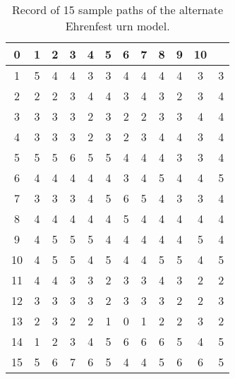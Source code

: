 \documentclass[12pt]{article}
\begin{document}
\begin{example}
    \begin{table}
      \centering
      \begin{tabular}{c|ccccccccccc}
        0 & 1 & 2 & 3 & 4 & 5 & 6 & 7 & 8 & 9 & 10 \\
        \hline
         1& 5 & 4 & 4 & 3 & 3 & 4 & 4 & 4 & 4 & 3 &  3 \\
         2& 2 & 2 & 3 & 4 & 4 & 3 & 4 & 3 & 2 & 3 &  4 \\
         3& 3 & 3 & 3 & 2 & 3 & 2 & 2 & 3 & 3 & 4 &  4 \\
         4& 3 & 3 & 3 & 2 & 3 & 2 & 3 & 4 & 4 & 3 &  4 \\
         5& 5 & 5 & 6 & 5 & 5 & 4 & 4 & 4 & 3 & 3 &  4 \\
         6& 4 & 4 & 4 & 4 & 4 & 3 & 4 & 5 & 4 & 4 &  5 \\
         7& 3 & 3 & 3 & 4 & 5 & 6 & 5 & 4 & 3 & 3 &  4 \\
         8& 4 & 4 & 4 & 4 & 4 & 5 & 4 & 4 & 4 & 4 &  4 \\
         9& 4 & 5 & 5 & 5 & 4 & 4 & 4 & 4 & 4 & 5 &  4 \\
        10& 4&  5&  5&  4&  5&  4&  4&  5&  5&  4&   5 \\
        11& 4&  4&  3&  3&  2&  3&  3&  4&  3&  2&   2 \\
        12& 3&  3&  3&  3&  2&  3&  3&  3&  2&  2&   3 \\
        13& 2&  3&  2&  2&  1&  0&  1&  2&  2&  3&   2 \\
        14& 1&  2&  3&  4&  5&  6&  6&  6&  5&  4&   5 \\
        15& 5&  6&  7&  6&  5&  4&  4&  5&  6&  6&   5 \\
      \end{tabular}
      \caption{Record of 15 sample paths of the alternate Ehrenfest
        urn model.}
      \label{tab:serialsignificance:recordpaths}
    \end{table}


\end{example}
\end{document}
